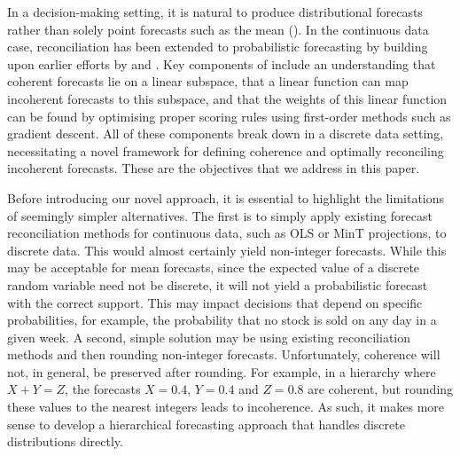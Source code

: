 \documentclass[a4paper,review,11pt,authoryear]{elsarticle}
\theoremstyle{definition}
\begin{document}
In a decision-making setting, it is natural to produce distributional forecasts rather than solely point forecasts such as the mean (\citealp{gneitingProbabilisticForecasting2014}). In the continuous data case, reconciliation has been extended to probabilistic forecasting by \cite{panagiotelisProbabilisticForecastReconciliation2022} building upon earlier efforts by \cite{jeonProbabilisticForecastReconciliation2019} and \cite{bentaiebHierarchicalProbabilisticForecasting2020}. Key components of \cite{panagiotelisProbabilisticForecastReconciliation2022} include an understanding that coherent forecasts lie on a linear subspace, that a linear function can map incoherent forecasts to this subspace, and that the weights of this linear function can be found by optimising proper scoring rules using first-order methods such as gradient descent. All of these components break down in a discrete data setting, necessitating a novel framework for defining coherence and optimally reconciling incoherent forecasts. These are the objectives that we address in this paper.

Before introducing our novel approach, it is essential to highlight the limitations of seemingly simpler alternatives. The first is to simply apply existing forecast reconciliation methods for continuous data, such as OLS or MinT projections, to discrete data. This would almost certainly yield non-integer forecasts. While this may be acceptable for mean forecasts, since the expected value of a discrete random variable need not be discrete, it will not yield a probabilistic forecast with the correct support. This may impact decisions that depend on specific probabilities, for example, the probability that no stock is sold on any day in a given week.  A second, simple solution may be using existing reconciliation methods and then rounding non-integer forecasts. Unfortunately, coherence will not, in general, be preserved after rounding. For example, in a hierarchy where $X+Y=Z$, the forecasts $X=0.4$, $Y=0.4$ and $Z=0.8$ are coherent, but rounding these values to the nearest integers leads to incoherence. As such, it makes more sense to develop a hierarchical forecasting approach that handles discrete distributions directly.
\end{document}
